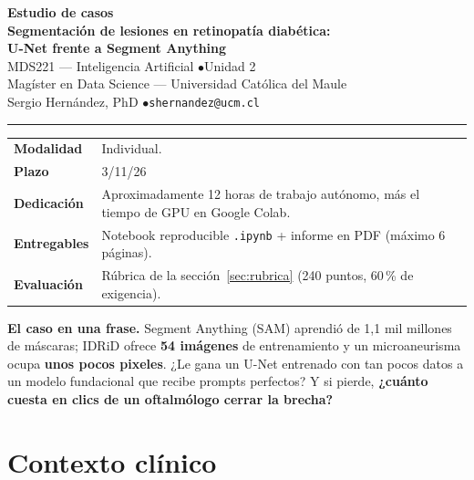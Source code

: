 \documentclass[11pt, a4paper]{article}
\begin{document}
\begin{center}
{\LARGE\bfseries\color{UCMNavy} Estudio de casos}\\[4pt]
{\Large\bfseries Segmentaci\'on de lesiones en retinopat\'ia diab\'etica:\\ U-Net frente a Segment Anything}\\[10pt]
{\normalsize MDS221 --- Inteligencia Artificial \quad$\bullet$\quad Unidad 2}\\[2pt]
{\normalsize Mag\'ister en Data Science --- Universidad Cat\'olica del Maule}\\[2pt]
{\small Sergio Hern\'andez, PhD \quad$\bullet$\quad \texttt{shernandez@ucm.cl}}
\end{center}
\vspace{0.4em}
\hrule
\vspace{1em}

\noindent
\begin{tabularx}{\textwidth}{@{}p{3.2cm}X@{}}
\textbf{Modalidad} & Individual.\\
\textbf{Plazo} & 3/11/26\\
\textbf{Dedicaci\'on} & Aproximadamente 12 horas de trabajo aut\'onomo, m\'as el tiempo de GPU en Google Colab.\\
\textbf{Entregables} & Notebook reproducible \texttt{.ipynb} + informe en PDF (m\'aximo 6 p\'aginas).\\
\textbf{Evaluaci\'on} & R\'ubrica de la secci\'on~\ref{sec:rubrica} (240 puntos, 60\,\% de exigencia).\\
\end{tabularx}

\vspace{0.8em}
\begin{pregunta}
\textbf{El caso en una frase.} Segment Anything (SAM) aprendi\'o de 1{,}1 mil millones de m\'ascaras; IDRiD ofrece \textbf{54 im\'agenes} de entrenamiento y un microaneurisma ocupa \textbf{unos pocos pixeles}. ¿Le gana un U-Net entrenado con tan pocos datos a un modelo fundacional que recibe prompts perfectos? Y si pierde, \textbf{¿cu\'anto cuesta en clics de un oftalm\'ologo cerrar la brecha?}
\end{pregunta}

\section{Contexto clínico}
\end{document}
